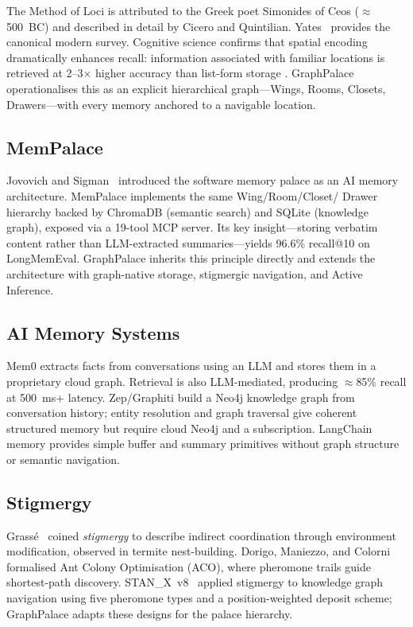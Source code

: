 \documentclass[11pt,a4paper]{article}
\begin{document}
The Method of Loci is attributed to the Greek poet Simonides of Ceos
($\approx$500~BC) and described in detail by Cicero and Quintilian.
Yates~\cite{yates1966} provides the canonical modern survey.  Cognitive science
confirms that spatial encoding dramatically enhances recall: information
associated with familiar locations is retrieved at 2--3$\times$ higher accuracy
than list-form storage \cite{maguire2003}.  GraphPalace operationalises this as
an explicit hierarchical graph---Wings, Rooms, Closets, Drawers---with every
memory anchored to a navigable location.

\subsection{MemPalace}

Jovovich and Sigman~\cite{jovovich2026} introduced the software memory palace
as an AI memory architecture.  MemPalace implements the same Wing/Room/Closet/
Drawer hierarchy backed by ChromaDB (semantic search) and SQLite
(knowledge graph), exposed via a 19-tool MCP server.  Its key insight---storing
verbatim content rather than LLM-extracted summaries---yields 96.6\% recall@10
on LongMemEval.  GraphPalace inherits this principle directly and extends the
architecture with graph-native storage, stigmergic navigation, and Active
Inference.

\subsection{AI Memory Systems}

Mem0 \cite{mem0_2024} extracts facts from conversations using an LLM and stores
them in a proprietary cloud graph.  Retrieval is also LLM-mediated, producing
$\approx$85\% recall at 500~ms+ latency.  Zep/Graphiti \cite{zep_2023} build a
Neo4j knowledge graph from conversation history; entity resolution and graph
traversal give coherent structured memory but require cloud Neo4j and a
subscription.  LangChain memory \cite{langchain_2022} provides simple buffer and
summary primitives without graph structure or semantic navigation.

\subsection{Stigmergy}

Grass\'e~\cite{grasse1959} coined \emph{stigmergy} to describe indirect
coordination through environment modification, observed in termite nest-building.
Dorigo, Maniezzo, and Colorni~\cite{dorigo1996} formalised Ant Colony
Optimisation (ACO), where pheromone trails guide shortest-path discovery.
STAN\_X~v8~\cite{stanx2026} applied stigmergy to knowledge graph navigation
using five pheromone types and a position-weighted deposit scheme; GraphPalace
adapts these designs for the palace hierarchy.
\end{document}
